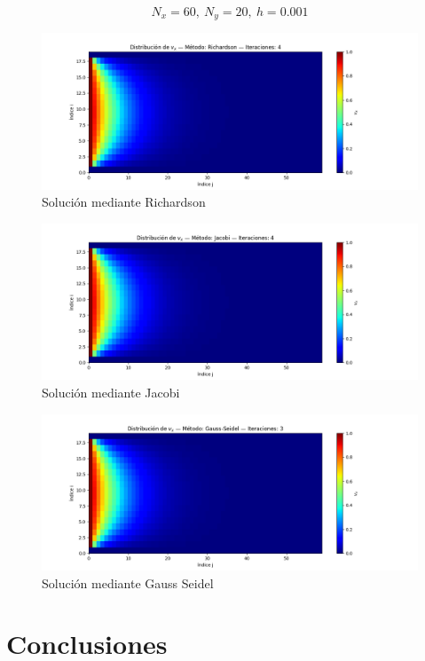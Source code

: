 \documentclass{article}
\begin{document}
  \[N_x=60, \ N_y=20, \ h=0.001\]

  \begin{figure}[H]
      \centering
      \includegraphics[width=1.2\textwidth]{Richardson.png}
      \caption{Solución mediante Richardson}
  \end{figure}

  \begin{figure}[H]
      \centering
      \includegraphics[width=1.2\textwidth]{Jacobi.png}
      \caption{Solución mediante Jacobi}
  \end{figure}

  \begin{figure}[H]
      \centering
      \includegraphics[width=1.2\textwidth]{GaussSeidel.png}
      \caption{Solución mediante Gauss Seidel}
  \end{figure}

  \section*{Conclusiones}

  \renewcommand{\refname}{Referencias}
  
  
\end{document}
